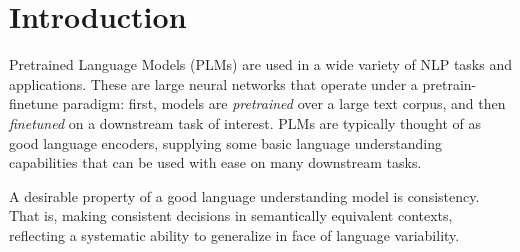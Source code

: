 \section{Introduction}
\label{sec:intro}

Pretrained Language Models (PLMs) are used in a wide variety of NLP tasks and applications. These are large neural networks that operate under a pretrain-finetune paradigm: first, models are \emph{pretrained} over a large text corpus, and then \emph{finetuned} on a downstream task of interest. PLMs are typically thought of as good language encoders, supplying some basic language understanding capabilities that can be used with ease on many downstream tasks.

A desirable property of a good language understanding model is consistency. That is, making consistent decisions in semantically equivalent contexts, reflecting a systematic ability to generalize in face  of language variability.

